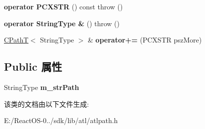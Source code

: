 \begin{DoxyCompactItemize}
{\bfseries operator P\+C\+X\+S\+TR} () const  throw ()
\item 
\mbox{\label{class_a_t_l_1_1_c_path_t_aba07c6009c83ffad00dcc8013187da24}} 
{\bfseries operator String\+Type \&} ()  throw ()
\item 
\mbox{\label{class_a_t_l_1_1_c_path_t_ace83edd16345bf5d52f8b365d633a440}} 
\hyperlink{class_a_t_l_1_1_c_path_t}{C\+PathT}$<$ String\+Type $>$ \& {\bfseries operator+=} (P\+C\+X\+S\+TR psz\+More)
\end{DoxyCompactItemize}
\subsection*{Public 属性}
\begin{DoxyCompactItemize}
\item 
\mbox{\label{class_a_t_l_1_1_c_path_t_a5182706df47c1d409294f7fda934cacf}} 
String\+Type {\bfseries m\+\_\+str\+Path}
\end{DoxyCompactItemize}


该类的文档由以下文件生成\+:\begin{DoxyCompactItemize}
\item 
E\+:/\+React\+O\+S-\/0../sdk/lib/atl/atlpath.\+h\end{DoxyCompactItemize}

